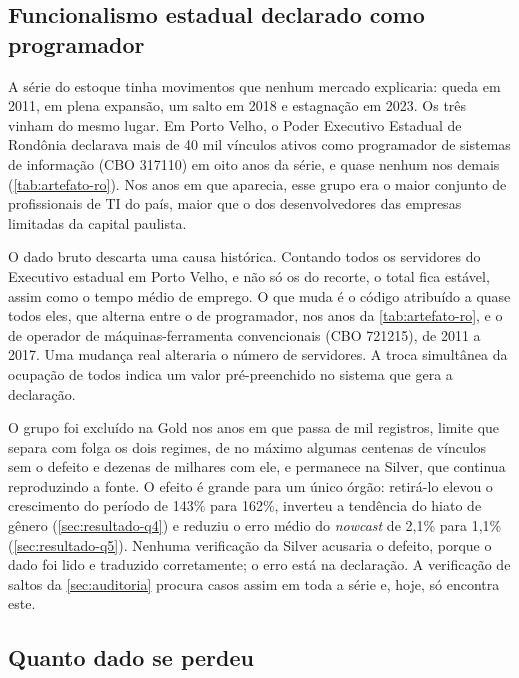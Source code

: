 \subsection{Funcionalismo estadual declarado como programador}
\label{subsec:artefato-ro}

A série do estoque tinha movimentos que nenhum mercado explicaria: queda em 2011, em plena expansão, um salto em 2018 e estagnação em 2023. Os três vinham do mesmo lugar. Em Porto Velho, o Poder Executivo Estadual de Rondônia declarava mais de 40 mil vínculos ativos como programador de sistemas de informação (CBO 317110) em oito anos da série, e quase nenhum nos demais (\autoref{tab:artefato-ro}). Nos anos em que aparecia, esse grupo era o maior conjunto de profissionais de TI do país, maior que o dos desenvolvedores das empresas limitadas da capital paulista.



O dado bruto descarta uma causa histórica. Contando todos os servidores do Executivo estadual em Porto Velho, e não só os do recorte, o total fica estável, assim como o tempo médio de emprego. O que muda é o código atribuído a quase todos eles, que alterna entre o de programador, nos anos da \autoref{tab:artefato-ro}, e o de operador de máquinas-ferramenta convencionais (CBO 721215), de 2011 a 2017. Uma mudança real alteraria o número de servidores. A troca simultânea da ocupação de todos indica um valor pré-preenchido no sistema que gera a declaração.

O grupo foi excluído na Gold nos anos em que passa de mil registros, limite que separa com folga os dois regimes, de no máximo algumas centenas de vínculos sem o defeito e dezenas de milhares com ele, e permanece na Silver, que continua reproduzindo a fonte. O efeito é grande para um único órgão: retirá-lo elevou o crescimento do período de 143\% para 162\%, inverteu a tendência do hiato de gênero (\autoref{sec:resultado-q4}) e reduziu o erro médio do \textit{nowcast} de 2,1\% para 1,1\% (\autoref{sec:resultado-q5}). Nenhuma verificação da Silver acusaria o defeito, porque o dado foi lido e traduzido corretamente; o erro está na declaração. A verificação de saltos da \autoref{sec:auditoria} procura casos assim em toda a série e, hoje, só encontra este.

\subsection{Quanto dado se perdeu}
\label{subsec:perdas}

